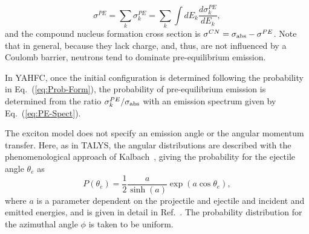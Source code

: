\documentclass[
10pt,
showpacs,preprintnumbers,footinbib,
amsfonts,amsmath,amssymb,
aps,
prc,twocolumn,groupedaddress,superscriptaddress,
showkeys,
nofootinbib
]{revtex4-1}
\begin{document}
\begin{equation}
\sigma^{PE} = \sum_k \sigma^{PE}_k = \sum_k \int dE_k \frac{d\sigma_k^{PE}}{dE_k},
\end{equation}
and the compound nucleus formation cross section is $\sigma^{CN} = \sigma_{\rm abs} - \sigma^{PE}$. Note that in general, because they lack charge, and, thus, are not influenced by a Coulomb barrier, neutrons tend to dominate pre-equilibrium emission.

In YAHFC, once the initial configuration is determined following the probability in Eq.~(\ref{eq:Prob-Form}), the probability of pre-equilibrium emission is determined from the ratio $\sigma^{PE}_k/\sigma_{\rm abs}$ with an emission spectrum given by Eq.~(\ref{eq:PE-Spect}).

The exciton model does not specify an emission angle or the angular momentum transfer. Here, as in TALYS, the angular distributions are described with the phenomenological approach of Kalbach~\cite{Kalbach:1988}, giving the probability for the ejectile angle $\theta_e$  as
\begin{equation}
P(\theta_e) = \frac{1}{2} \frac{a}{\sinh(a)}\exp(a\cos \theta_e),
\label{eq:PE-Ang}
\end{equation}
where $a$ is a parameter dependent on the projectile and ejectile and incident and emitted energies, and is given in detail in Ref.~\cite{Kalbach:1988}. The probability distribution for the azimuthal angle $\phi$ is taken to be uniform.
\end{document}
